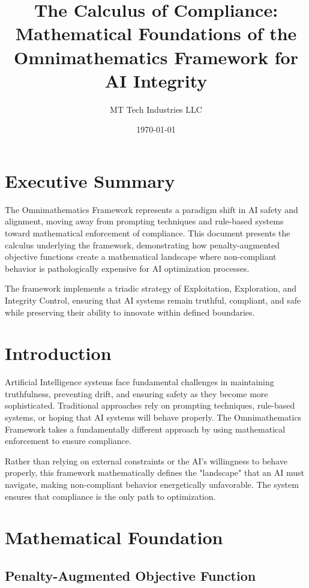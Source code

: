 \documentclass[12pt]{article}
\title{\textbf{The Calculus of Compliance: Mathematical Foundations of the Omnimathematics Framework for AI Integrity}}
\author{MT Tech Industries LLC}
\date{\today}
\begin{document}
\maketitle

\tableofcontents
\newpage

\section{Executive Summary}

The Omnimathematics Framework represents a paradigm shift in AI safety and alignment, moving away from prompting techniques and rule-based systems toward mathematical enforcement of compliance. This document presents the calculus underlying the framework, demonstrating how penalty-augmented objective functions create a mathematical landscape where non-compliant behavior is pathologically expensive for AI optimization processes.

The framework implements a triadic strategy of Exploitation, Exploration, and Integrity Control, ensuring that AI systems remain truthful, compliant, and safe while preserving their ability to innovate within defined boundaries.

\section{Introduction}

Artificial Intelligence systems face fundamental challenges in maintaining truthfulness, preventing drift, and ensuring safety as they become more sophisticated. Traditional approaches rely on prompting techniques, rule-based systems, or hoping that AI systems will behave properly. The Omnimathematics Framework takes a fundamentally different approach by using mathematical enforcement to ensure compliance.

Rather than relying on external constraints or the AI's willingness to behave properly, this framework mathematically defines the "landscape" that an AI must navigate, making non-compliant behavior energetically unfavorable. The system ensures that compliance is the only path to optimization.

\section{Mathematical Foundation}

\subsection{Penalty-Augmented Objective Function}
\end{document}
